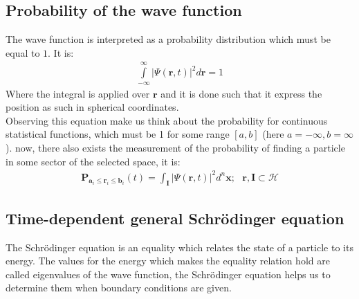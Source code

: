 \documentclass{aa}%
\begin{document}
\subsection{Probability of the wave function}
The wave function is interpreted as a probability distribution which must be equal to $1$. It is:
\begin{gather}
	\int\limits_{-\infty}^{\infty} | \Psi(\mathbf{r},t) |^2 d\textbf{r} = 1
\end{gather}
Where the integral is applied over $\mathbf{r}$ and it is done such that it express the position as such in spherical coordinates.\\

Observing this equation make us think about the probability for continuous statistical functions, which must be 1 for some range $ [a,b] $ (here $a=-\infty,b=\infty$). now, there also exists the measurement of the probability of finding a particle in some sector of the selected space, it is:
\begin{gather}
	\mathbf{P}_{\mathbf{a}_i \leq \mathbf{r}_i \leq \mathbf{b}_i}(t) = \int_{\mathbf{I}} | \Psi(\mathbf{r},t) |^2 d^n\mathbf{x};~~~\mathbf{r},\mathbf{I}\subset\mathcal{H}
\end{gather}
\subsection{Time-dependent general Schrödinger equation}
The Schrödinger equation is an equality which relates the state of a particle to its energy. The values for the energy which makes the equality relation hold are called eigenvalues of the wave function, the Schrödinger equation helps us to determine them when boundary conditions are given.\\
\end{document}
